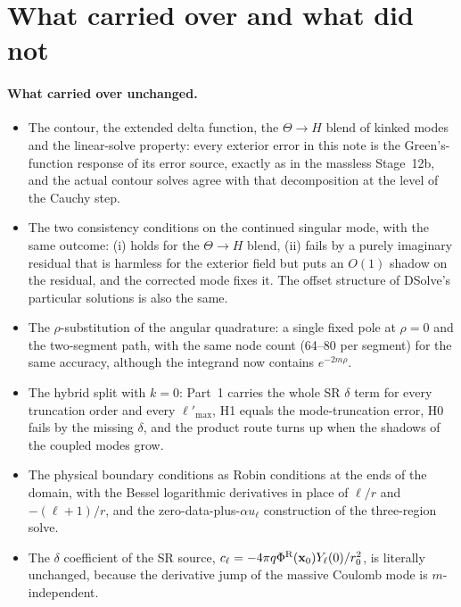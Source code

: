 \documentclass[11pt,a4paper]{article}
\newcommand{\x}{\mathbf{x}}
\newcommand{\PhiR}{\Phi^{\rm R}}
\newcommand{\lpm}{{\ell'_{\max}}}
\begin{document}
\section{What carried over and what did not}\label{sec:carry}
\paragraph{What carried over unchanged.}
\begin{itemize}[leftmargin=*]
\item The contour, the extended delta function, the $\Theta\to H$ blend of kinked modes and the linear-solve property: every exterior error in this note is the Green's-function response of its error source, exactly as in the massless Stage~12b, and the actual contour solves agree with that decomposition at the level of the Cauchy step.
\item The two consistency conditions on the continued singular mode, with the same outcome: (i) holds for the $\Theta\to H$ blend, (ii) fails by a purely imaginary residual that is harmless for the exterior field but puts an $O(1)$ shadow on the residual, and the corrected mode fixes it. The offset structure of DSolve's particular solutions is also the same.
\item The $\rho$-substitution of the angular quadrature: a single fixed pole at $\rho=0$ and the two-segment path, with the same node count (64--80 per segment) for the same accuracy, although the integrand now contains $e^{-2m\rho}$.
\item The hybrid split with $k=0$: Part~1 carries the whole SR $\delta$ term for every truncation order and every $\lpm$, H1 equals the mode-truncation error, H0 fails by the missing $\delta$, and the product route turns up when the shadows of the coupled modes grow.
\item The physical boundary conditions as Robin conditions at the ends of the domain, with the Bessel logarithmic derivatives in place of $\ell/r$ and $-(\ell+1)/r$, and the zero-data-plus-$\alpha u_\ell$ construction of the three-region solve.
\item The $\delta$ coefficient of the SR source, $c_\ell=-4\pi q\PhiR(\x_0)Y_\ell(0)/r_0^2$, is literally unchanged, because the derivative jump of the massive Coulomb mode is $m$-independent.
\end{itemize}
\end{document}
